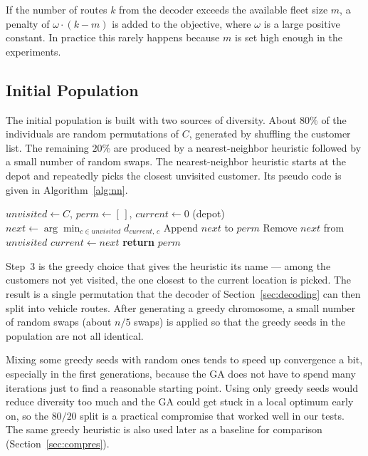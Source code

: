 \documentclass [a4paper, 11pt, titlepage] {article}
\begin{document}
If the number of routes $k$ from the decoder exceeds the available fleet size $m$, a penalty of $\omega \cdot (k - m)$ is added to the objective, where $\omega$ is a large positive constant. In practice this rarely happens because $m$ is set high enough in the experiments.

\subsection{Initial Population}
\label{sec:initpop}

The initial population is built with two sources of diversity. About $80\%$ of the individuals are random permutations of $C$, generated by shuffling the customer list. The remaining $20\%$ are produced by a nearest-neighbor heuristic followed by a small number of random swaps. The nearest-neighbor heuristic starts at the depot and repeatedly picks the closest unvisited customer. Its pseudo code is given in Algorithm~\ref{alg:nn}.

\begin{algorithm}[H]
\caption{Nearest-Neighbor Greedy Heuristic}
\label{alg:nn}
\begin{algorithmic}[1]
    \STATE $unvisited \gets C$, $perm \gets [\,]$, $current \gets 0$ (depot)
        \STATE $next \gets \arg\min_{c \in unvisited} d_{current,\,c}$
        \STATE Append $next$ to $perm$
        \STATE Remove $next$ from $unvisited$
        \STATE $current \gets next$
    \ENDWHILE
    \STATE \textbf{return} $perm$
\end{algorithmic}
\end{algorithm}

Step~3 is the greedy choice that gives the heuristic its name --- among the customers not yet visited, the one closest to the current location is picked. The result is a single permutation that the decoder of Section~\ref{sec:decoding} can then split into vehicle routes. After generating a greedy chromosome, a small number of random swaps (about $n/5$ swaps) is applied so that the greedy seeds in the population are not all identical.

Mixing some greedy seeds with random ones tends to speed up convergence a bit, especially in the first generations, because the GA does not have to spend many iterations just to find a reasonable starting point. Using only greedy seeds would reduce diversity too much and the GA could get stuck in a local optimum early on, so the $80/20$ split is a practical compromise that worked well in our tests. The same greedy heuristic is also used later as a baseline for comparison (Section~\ref{sec:compres}).
\end{document}
